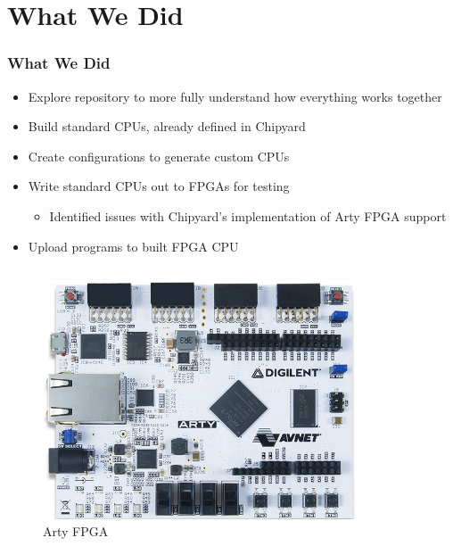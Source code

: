 \documentclass{eceday}
\begin{document}
\section{What We Did}\label{sec:What_We_Did}
\begin{frame}
  \frametitle{What We Did}
  \begin{itemize}
  \item Explore repository to more fully understand how everything works together
  \item Build standard CPUs, already defined in Chipyard
  \item Create configurations to generate custom CPUs
  \item Write standard CPUs out to FPGAs for testing
    \begin{itemize}
    \item Identified issues with Chipyard's implementation of Arty FPGA support
    \end{itemize}
  \item Upload programs to built FPGA CPU
  \end{itemize}
  \begin{columns}
    \begin{column}{0.50\linewidth}
      \begin{figure}[h!tbp]
        \centering
        \includegraphics[scale=0.18]{./Arty_FPGA.png}
        \caption{Arty FPGA}
        \label{fig:Arty_FPGA}
      \end{figure}
    \end{column}
    \begin{column}{0.50\linewidth}
      \begin{figure}[h!tbp]

\end{figure}
\end{column}
\end{columns}
\end{frame}
\end{document}
